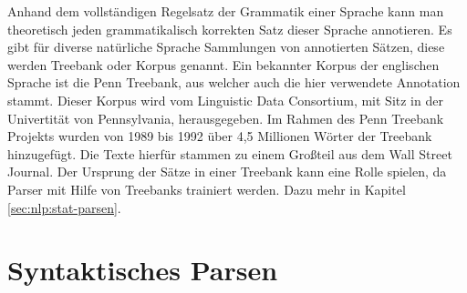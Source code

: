 Anhand dem vollständigen Regelsatz der Grammatik einer Sprache kann man theoretisch jeden grammatikalisch korrekten Satz dieser Sprache annotieren. Es gibt für diverse natürliche Sprache Sammlungen von annotierten Sätzen, diese werden Treebank oder Korpus genannt. Ein bekannter Korpus der englischen Sprache ist die Penn Treebank, aus welcher auch die hier verwendete Annotation stammt. Dieser Korpus wird vom Linguistic Data Consortium, mit Sitz in der Univertität von Pennsylvania, herausgegeben. %
Im Rahmen des Penn Treebank Projekts wurden von 1989 bis 1992 über 4,5 Millionen Wörter der Treebank hinzugefügt. Die Texte hierfür stammen zu einem Großteil aus dem Wall Street Journal. Der Ursprung der Sätze in einer Treebank kann eine Rolle spielen, da Parser mit Hilfe von Treebanks trainiert werden. Dazu mehr in Kapitel \ref{sec:nlp:stat-parsen}. %

\section{Syntaktisches Parsen}
\label{sec:nlp:syn-parsen}

